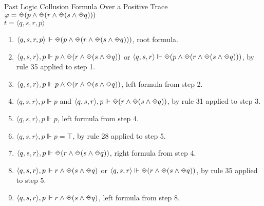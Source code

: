 \begin{myEx} Past Logic Collusion Formula Over a Positive Trace\\

$\varphi = \LTLonce(p \land \LTLonce(r \land \LTLonce(s \land \LTLonce q)))$\\
\indent $t = \langle q, s, r, p \rangle$\\

\begin{enumerate}
\item $\langle q,s,r,p \rangle \Vdash \LTLonce(p \land \LTLonce(r \land \LTLonce(s \land \LTLonce q)))$, root formula.\\ %

\item $\langle q,s,r \rangle, p \Vdash p \land \LTLonce(r \land \LTLonce(s \land \LTLonce q))$ or $\langle q,s,r \rangle \Vdash \LTLonce(p \land \LTLonce(r \land \LTLonce(s \land \LTLonce q)))$, by rule 35 applied to step 1.\\ %

\item $\langle q,s,r \rangle, p \Vdash p \land \LTLonce(r \land \LTLonce(s \land \LTLonce q))$, left formula from step 2.\\ %

\item $\langle q,s,r \rangle, p \Vdash p$ and $\langle q,s,r \rangle, p \Vdash \LTLonce(r \land \LTLonce(s \land \LTLonce q))$, by rule 31 applied to step 3.\\ %

\item $\langle q,s,r \rangle, p \Vdash p$, left formula from step 4.\\ %

\item $\langle q,s,r \rangle, p \Vdash p = \top$, by rule 28 applied to step 5.\\ %

\item $\langle q,s,r \rangle, p \Vdash \LTLonce(r \land \LTLonce(s \land \LTLonce q))$, right formula from step 4.\\ %

\item $\langle q,s,r \rangle, p \Vdash r \land \LTLonce(s \land \LTLonce q)$ or $\langle q,s,r \rangle \Vdash \LTLonce(r \land \LTLonce(s \land \LTLonce q))$, by rule 35 applied to step 5.\\ %

\item $\langle q,s,r \rangle, p \Vdash r \land \LTLonce(s \land \LTLonce q)$, left formula from step 8.\\ %


\end{enumerate}
\end{myEx}
